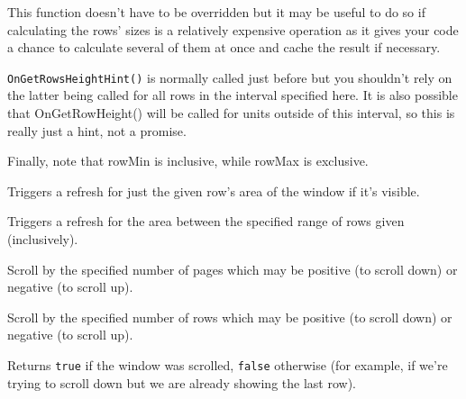 
This function doesn't have to be overridden but it may be useful to do so if
calculating the rows' sizes is a relatively expensive operation as it gives
your code a chance to calculate several of them at once and cache the result
if necessary.

{\tt OnGetRowsHeightHint()} is normally called just before
 but you
shouldn't rely on the latter being called for all rows in the interval
specified here. It is also possible that OnGetRowHeight() will be called for
units outside of this interval, so this is really just a hint, not a promise.

Finally, note that rowMin is inclusive, while rowMax is exclusive.


\label{wxvarvscrollhelperrefreshrow}


Triggers a refresh for just the given row's area of the window if it's visible.


\label{wxvarvscrollhelperrefreshrows}


Triggers a refresh for the area between the specified range of rows given
(inclusively).


\label{wxvarvscrollhelperscrollrowpages}


Scroll by the specified number of pages which may be positive (to scroll down)
or negative (to scroll up).


\label{wxvarvscrollhelperscrollrows}


Scroll by the specified number of rows which may be positive (to scroll down)
or negative (to scroll up).

Returns {\tt true} if the window was scrolled, {\tt false} otherwise (for
example, if we're trying to scroll down but we are already showing the last
row).


\label{wxvarvscrollhelperscrolltorow}

